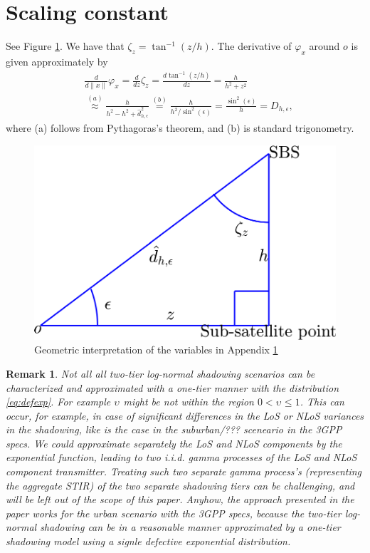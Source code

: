 \documentclass[lettersize,journal]{IEEEtran}
\newtheorem*{remark}{Remark}
\begin{document}
\section{Scaling constant}


\label{app:constantD}
See Figure \ref{fig:triangle}. We have that $\zeta_{z}= \tan^{-1}(z/h)$. The derivative of $\varphi_x$  around $\textit{o}$ is given approximately by
\begin{align}
  &\frac{d}{d \| x\|}\varphi_{x} =\frac{d}{dz}\zeta_{z}  = \frac{d\tan^{-1}(z/h)}{dz} = \frac{h}{h^2 + z^2}   \nonumber\\
  &\overset{(a)}{\approx} \frac{h}{h^2 -h^2 + \hat{d}^2_{h,\epsilon}}  \overset{(b)}{=}\frac{h}{ h^2/\sin^2(\epsilon)} = \frac{\sin^2(\epsilon)}{h} = D_{h,\epsilon},
\end{align}
where (a) follows from Pythagoras's theorem, and (b) is standard trigonometry.

\begin{figure}[h]
  \centering
  \includegraphics[width=0.7\linewidth]{triangle.pdf}
  \caption{Geometric interpretation of the variables in Appendix \ref{app:constantD} }
  \label{fig:triangle}
\end{figure}




\begin{remark}
  Not all all two-tier log-normal shadowing scenarios can be characterized and approximated with a one-tier manner with the distribution \eqref{eq:defexp}. For example $\upsilon_{}$ might be not within the region $0<\upsilon_{} \leq 1$. This can occur, for example, in case of significant differences in the LoS or NLoS variances in the shadowing, like is the case in the suburban/??? sceneario in the 3GPP specs. We could approximate separately the LoS and NLoS components by the exponential function, leading to two i.i.d. gamma processes of the LoS and NLoS component transmitter. Treating such two separate gamma process's (representing the aggregate STIR) of the two separate shadowing tiers can be challenging, and will be left out of the scope of this paper. Anyhow, the approach presented in the paper works for the urban scenario with the 3GPP specs, because the two-tier log-normal shadowing can be in a reasonable manner approximated by a one-tier shadowing model using a signle defective exponential distribution.
\end{remark}



%

\end{document}
